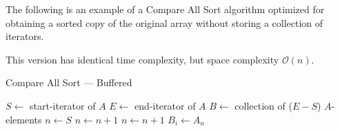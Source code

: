 \documentclass{article}
\begin{document}
\clearpage

\begin{samepage}
The following is an example of a Compare All Sort algorithm optimized for obtaining a sorted copy of the original array without storing a collection of iterators.

\nopagebreak
This version has identical time complexity, but space complexity \(\mathcal{O}(n)\).

\nopagebreak
\begin{algorithm}[H]
    \caption{Compare All Sort --- Buffered}\label{alg:compare all buffered}
    \(S \gets \) start-iterator of \(A\) \;
    \(E \gets \) end-iterator of \(A\) \;
    \(B \gets \) collection of (\(E-S\)) \(A\)-elements \;
     {
        \(n \gets S\) \;
        \BlankLine{}
         {
             {
                \(n \gets n + 1\) \;
            }
        }
        \BlankLine{}
         {
             {
                \(n \gets n + 1\) \;
            }
        }
        \BlankLine{}
        \(B_i \gets A_{n}\) \;
    }
\end{algorithm}
\end{samepage}
\end{document}

